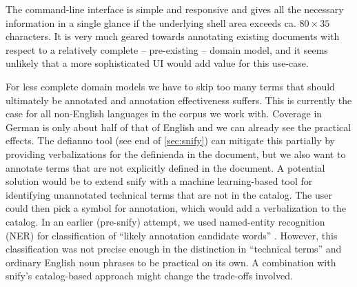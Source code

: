 \documentclass[runningheads]{llncs}
\newcommand\snify{\textsf{snify}\xspace}
\newcommand\defianno{\textsf{defianno}\xspace}
\begin{document}
The command-line interface is simple and responsive and gives all the necessary
information in a single glance if the underlying shell area exceeds ca. $80\times 35$
characters. It is very much geared towards annotating existing documents with respect to a
relatively complete -- pre-existing -- domain model, and it seems unlikely that a more
sophisticated UI would add value for this use-case.

For less complete domain models we have to skip too many terms that should ultimately be
annotated and annotation effectiveness suffers. This is currently the case for all
non-English languages in the \sTeX corpus we work with. Coverage in German is only about
half of that of English and we can already see the practical effects.  The \defianno tool
(see end of \cref{sec:snify}) can mitigate this partially by providing verbalizations for
the definienda in the document, but we also want to annotate terms that are not explicitly
defined in the document.  A potential solution would be to extend \snify with a machine
learning-based tool for identifying unannotated technical terms that are not in the
catalog.  The user could then pick a symbol for annotation, which would add a
verbalization to the catalog.  In an earlier (pre-\snify) attempt, we used named-entity
recognition (NER) for classification of ``likely annotation candidate words''
\cite{hutterer:msc23}. However, this classification was not precise enough in the
distinction in ``technical terms'' and ordinary English noun phrases to be practical on
its own.  A combination with \snify's catalog-based approach might change the trade-offs
involved.


\end{document}
